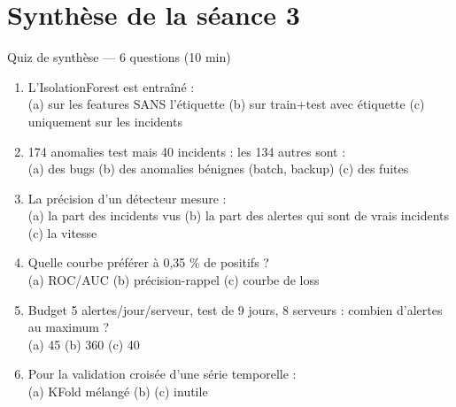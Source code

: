 \section{Synthèse de la séance 3}

\begin{frame}{Quiz de synthèse --- 6 questions (10 min)}
\begin{qbox}
\begin{enumerate}
\item L'IsolationForest est entraîné :\\
(a) sur les features SANS l'étiquette \quad (b) sur train+test
avec étiquette \quad (c) uniquement sur les incidents
\item 174 anomalies test mais 40 incidents : les 134 autres sont :\\
(a) des bugs \quad (b) des anomalies bénignes (batch, backup) \quad
(c) des fuites
\item La précision d'un détecteur mesure :\\
(a) la part des incidents vus \quad (b) la part des alertes
qui sont de vrais incidents \quad (c) la vitesse
\item Quelle courbe préférer à 0,35 \% de positifs ?\\
(a) ROC/AUC \quad (b) précision-rappel \quad (c) courbe de loss
\item Budget 5 alertes/jour/serveur, test de 9 jours, 8 serveurs :
combien d'alertes au maximum ?\\
(a) 45 \quad (b) 360 \quad (c) 40
\item Pour la validation croisée d'une série temporelle :\\
(a) KFold mélangé \quad (b)  \quad (c) inutile
\end{enumerate}
\end{qbox}
\end{frame}


